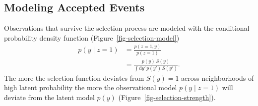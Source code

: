\documentclass[
  letterpaper,
  DIV=11,
  numbers=noendperiod]{scrartcl}
\begin{document}
\subsection{Modeling Accepted Events}\label{modeling-accepted-events}

Observations that survive the selection process are modeled with the
conditional probability density function
(Figure~\ref{fig-selection-model}) \begin{align*}
p(y \mid z = 1)
&=
\frac{ p(z = 1, y) }{ p(z = 1) }
\\
&=
\frac{ p(y) \, S(y)  }{ \int \mathrm{d}y' \, p(y') \, S(y') }.
\end{align*} The more the selection function deviates from \(S(y) = 1\)
across neighborhoods of high latent probability the more the
observational model \(p(y \mid z = 1)\) will deviate from the latent
model \(p(y)\) (Figure~\ref{fig-selection-strength}).
\end{document}
